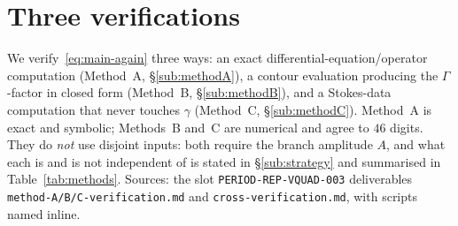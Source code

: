 \documentclass[11pt,reqno]{amsart}
\renewcommand{\_}{\vquadorigunderscore\allowbreak}
\theoremstyle{plain}
\theoremstyle{definition}
\begin{document}
\section{Three verifications}\label{sec:verif}

We verify~\eqref{eq:main-again} three ways: an exact
differential-equation/operator computation (Method~A, \S\ref{sub:methodA}), a contour evaluation
producing the $\Gamma$-factor in closed form (Method~B, \S\ref{sub:methodB}), and a Stokes-data
computation that never touches $\gamma$ (Method~C, \S\ref{sub:methodC}). Method~A is exact and
symbolic; Methods~B and~C are numerical and agree to $46$ digits. They do \emph{not} use disjoint
inputs: both require the branch amplitude $A$, and what each is and is not independent of is
stated in \S\ref{sub:strategy} and summarised in Table~\ref{tab:methods}. Sources: the slot
\texttt{PERIOD-REP-VQUAD-003} deliverables \texttt{method-A/B/C-verification.md} and
\texttt{cross-verification.md}, with scripts named inline.
\end{document}
